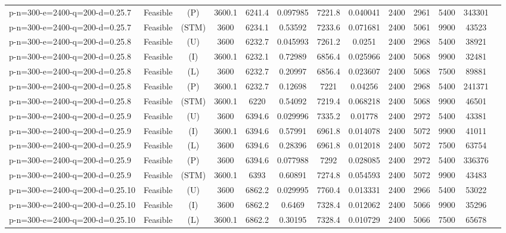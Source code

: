 \documentclass[landscape, a4paper]{article}
\newcommand{\STM}{\ensuremath{\mathrm{STM}}}
\newcommand{\Improved}{\ensuremath{\mathrm{I}}}
\newcommand{\Loose}{\ensuremath{\mathrm{L}}}
\newcommand{\Profit}{\ensuremath{\mathrm{P}}}
\newcommand{\Utility}{\ensuremath{\mathrm{U}}}
\begin{document}
\begin{center}
\begin{tabular}{lcccccccccccc}
p-n=300-e=2400-q=200-d=0.25.7 & Feasible & (\Profit) & 3600.1 & 6241.4 & 0.097985 & 7221.8 & 0.040041 & 2400 & 2961 & 5400 & 343301 & \\
p-n=300-e=2400-q=200-d=0.25.7 & Feasible & (\STM) & 3600 & 6234.1 & 0.53592 & 7233.6 & 0.071681 & 2400 & 5061 & 9900 & 43523 & \\
p-n=300-e=2400-q=200-d=0.25.8 & Feasible & (\Utility) & 3600 & 6232.7 & 0.045993 & 7261.2 & 0.0251 & 2400 & 2968 & 5400 & 38921 & \\
p-n=300-e=2400-q=200-d=0.25.8 & Feasible & (\Improved) & 3600.1 & 6232.1 & 0.72989 & 6856.4 & 0.025966 & 2400 & 5068 & 9900 & 32481 & \\
p-n=300-e=2400-q=200-d=0.25.8 & Feasible & (\Loose) & 3600 & 6232.7 & 0.20997 & 6856.4 & 0.023607 & 2400 & 5068 & 7500 & 89881 & \\
p-n=300-e=2400-q=200-d=0.25.8 & Feasible & (\Profit) & 3600.1 & 6232.7 & 0.12698 & 7221 & 0.04256 & 2400 & 2968 & 5400 & 241371 & \\
p-n=300-e=2400-q=200-d=0.25.8 & Feasible & (\STM) & 3600.1 & 6220 & 0.54092 & 7219.4 & 0.068218 & 2400 & 5068 & 9900 & 46501 & \\
p-n=300-e=2400-q=200-d=0.25.9 & Feasible & (\Utility) & 3600 & 6394.6 & 0.029996 & 7335.2 & 0.01778 & 2400 & 2972 & 5400 & 43381 & \\
p-n=300-e=2400-q=200-d=0.25.9 & Feasible & (\Improved) & 3600.1 & 6394.6 & 0.57991 & 6961.8 & 0.014078 & 2400 & 5072 & 9900 & 41011 & \\
p-n=300-e=2400-q=200-d=0.25.9 & Feasible & (\Loose) & 3600 & 6394.6 & 0.28396 & 6961.8 & 0.012018 & 2400 & 5072 & 7500 & 63754 & \\
p-n=300-e=2400-q=200-d=0.25.9 & Feasible & (\Profit) & 3600 & 6394.6 & 0.077988 & 7292 & 0.028085 & 2400 & 2972 & 5400 & 336376 & \\
p-n=300-e=2400-q=200-d=0.25.9 & Feasible & (\STM) & 3600.1 & 6393 & 0.60891 & 7274.8 & 0.054593 & 2400 & 5072 & 9900 & 43483 & \\
p-n=300-e=2400-q=200-d=0.25.10 & Feasible & (\Utility) & 3600 & 6862.2 & 0.029995 & 7760.4 & 0.013331 & 2400 & 2966 & 5400 & 53022 & \\
p-n=300-e=2400-q=200-d=0.25.10 & Feasible & (\Improved) & 3600 & 6862.2 & 0.6469 & 7328.4 & 0.012062 & 2400 & 5066 & 9900 & 35296 & \\
p-n=300-e=2400-q=200-d=0.25.10 & Feasible & (\Loose) & 3600.1 & 6862.2 & 0.30195 & 7328.4 & 0.010729 & 2400 & 5066 & 7500 & 65678 & \\

\end{tabular}
\end{center}
\end{document}
